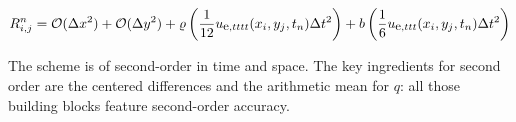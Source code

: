 \documentclass[letterpaper,10pt,english]{/usr/share/sphinx/texinputs/sphinxhowto}
\begin{document}
\begin{align*}
R^n_{i,j} = {\mathcal{O}(\Delta x^2)} + {\mathcal{O}(\Delta y^2)}+\varrho\left(\frac{1}{12}{u_{\small\mbox{e}, tttt}}(x_i,y_j,t_n)\Delta t^2 \right)
+ b \left(\frac{1}{6}u_{\small\mbox{e}, ttt}(x_i,y_j,t_n) \Delta t^2 
\right) 
\end{align*}

The scheme is of second-order in time and space. The key ingredients for
second order are the centered differences and the arithmetic mean for
$q$: all those building blocks feature second-order accuracy.
        

        \renewcommand{\indexname}{Index}
        \printindex

    
\end{document}
